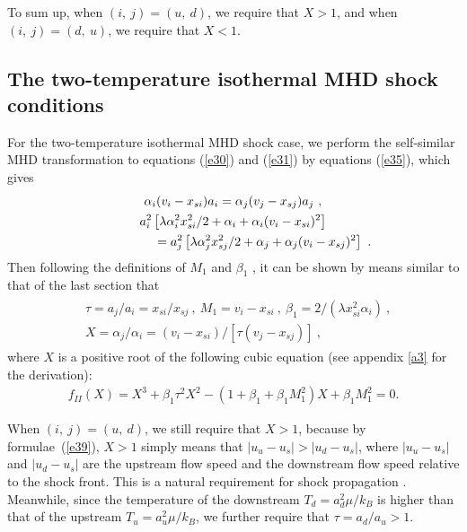 \documentclass[fleqn,usenatbib]{mnras}
\begin{document}
To sum up, when $(i,\ j)=(u,\ d)$, we require that $X>1$, and when $(i,\ j)=(d,\ u)$, we require that $X<1$.

\subsection{The two-temperature isothermal MHD shock conditions}
\label{s3.2}
For the two-temperature isothermal MHD shock case, we perform the self-similar MHD transformation to equations (\ref{e30}) and (\ref{e31}) by equations (\ref{e35}), which gives
\begin{gather}
\alpha_{i}(v_{i}-x_{si})a_{i}=\alpha_{j}(v_{j}-x_{sj})a_{j}\ ,\\
a^{2}_{i}\left[ \lambda \alpha_{i}^{2} x_{si}^{2}/2+\alpha_{i}+\alpha_{i}(v_{i}-x_{si})^{2}\right]\notag\\
 \qquad\qquad \quad =a^{2}_{j}\left[ \lambda \alpha_{j}^{2}
 x_{sj}^{2}/2+\alpha_{j}+\alpha_{j}(v_{i}-x_{sj})^{2}\right]\ .
 \label{e38}
\end{gather}
Then following the definitions of $M_{1}$ and $\beta_{1}$ , it can be shown by means similar to that of the last section that
\begin{gather}
\begin{split}
&\tau=a_{j}/a_{i}=x_{si}/x_{sj}\ ,
\ M_{1}=v_{i}-x_{si}\ ,
\ \beta_{1}=2/(\lambda x^{2}_{si}\alpha_{i})\ ,\\
&X=\alpha_{j}/\alpha_{i}=(v_{i}-x_{si})/[\tau (v_{j}-x_{sj})]\ ,
\end{split}\label{e39}
\end{gather}
where $X$ is a positive root of the following cubic equation (see appendix \ref{a3} for the derivation):
\begin{gather}
f_{II}(X)=X^{3}+\beta_{1}\tau^{2} X^{2}
 -(1+\beta_{1}
 +\beta_{1} M_{1}^{2}) X+\beta_{1}M_{1}^{2}=0. \label{e40}
\end{gather}

When $(i,\ j)=(u,\ d)$, we still require that $X>1$, because by formulae~(\ref{e39}), $X>1$ simply means that $|u_{u}-u_{s}|>|u_{d}-u_{s}|$, where $|u_{u}-u_{s}|$ and $|u_{d}-u_{s}|$ are the upstream flow speed and the downstream flow speed relative to the shock front. This is a natural requirement for shock propagation \citep{FM}. Meanwhile, since the temperature of the downstream $T_{d}=a_{d}^{2}\mu/k_{B}$ is higher than that of the upstream $T_{u}=a_{u}^{2}\mu/k_{B}$, we further require that $\tau=a_{d}/a_{u}>1$. 
\end{document}
